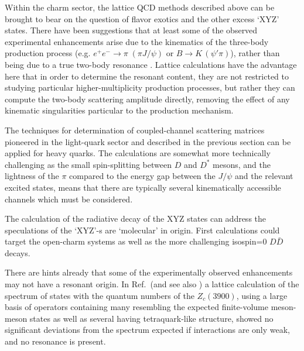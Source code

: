 

Within the charm sector, the lattice QCD methods described above can be brought to bear on the question of flavor exotics and the other excess `XYZ' states. There have been suggestions that at least some of the observed experimental enhancements arise due to the kinematics of the three-body production process (e.g. $e^+e^- \to \pi \; (\pi J/\psi) $ or $B \to K \, (\psi' \pi)$), rather than being due to a true two-body resonance \cite{Szczepaniak:2015eza}. Lattice calculations have the advantage here that in order to determine the resonant content, they are not restricted to studying particular higher-multiplicity production processes, but rather they can compute the two-body scattering amplitude directly, removing the effect of any kinematic singularities particular to the production mechanism.


The techniques for determination of coupled-channel scattering matrices pioneered in the light-quark sector and described in the previous section can be applied for heavy quarks. The calculations are somewhat more technically challenging as the small spin-splitting between $D$ and $D^*$ mesons, and the lightness of the $\pi$ compared to the energy gap between the $J/\psi$ and the relevant excited states, means that there are typically several kinematically accessible channels which must be considered.


The calculation of the radiative decay of the XYZ states can address the speculations of the `XYZ'-s are `molecular' in origin. First calculations could target the open-charm systems as well as the more challenging isospin=0 $D\bar{D}$ decays.

There are hints already that some of the experimentally observed enhancements may not have a resonant origin. In Ref.~\cite{Cheung:2017tnt}(and see also \cite{Prelovsek:2014swa}) a lattice calculation of the spectrum of states with the quantum numbers of the $Z_c(3900)$, using a large basis of operators containing many resembling the expected finite-volume meson-meson states as well as several having tetraquark-like structure, showed no significant deviations from the spectrum expected if interactions are only weak, and no resonance is present. 

